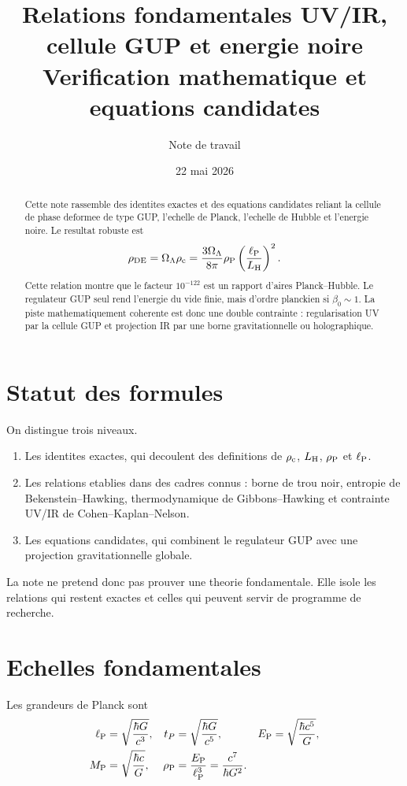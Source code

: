 \documentclass[11pt,a4paper]{article}
\title{Relations fondamentales UV/IR, cellule GUP et energie noire\\
\large Verification mathematique et equations candidates}
\author{Note de travail}
\date{22 mai 2026}
\newcommand{\lp}{\ell_{\rm P}}
\newcommand{\rhoP}{\rho_{\rm P}}
\newcommand{\rhoDE}{\rho_{\rm DE}}
\newcommand{\rhoC}{\rho_{\rm c}}
\newcommand{\LH}{L_{\rm H}}
\newcommand{\EP}{E_{\rm P}}
\newcommand{\Mpl}{M_{\rm P}}
\begin{document}
\maketitle

\begin{abstract}
Cette note rassemble des identites exactes et des equations candidates reliant
la cellule de phase deformee de type GUP, l'echelle de Planck, l'echelle de
Hubble et l'energie noire. Le resultat robuste est
\[
\rhoDE=\Omega_\Lambda\rhoC
=\frac{3\Omega_\Lambda}{8\pi}\rhoP\left(\frac{\lp}{\LH}\right)^2.
\]
Cette relation montre que le facteur $10^{-122}$ est un rapport d'aires
Planck--Hubble. Le regulateur GUP seul rend l'energie du vide finie, mais
d'ordre planckien si $\beta_0\sim1$. La piste mathematiquement coherente est
donc une double contrainte : regularisation UV par la cellule GUP et projection
IR par une borne gravitationnelle ou holographique.
\end{abstract}

\tableofcontents
\newpage

\section{Statut des formules}

On distingue trois niveaux.
\begin{enumerate}
  \item Les identites exactes, qui decoulent des definitions de $\rhoC$, $\LH$,
  $\rhoP$ et $\lp$.
  \item Les relations etablies dans des cadres connus : borne de trou noir,
  entropie de Bekenstein--Hawking, thermodynamique de Gibbons--Hawking et
  contrainte UV/IR de Cohen--Kaplan--Nelson.
  \item Les equations candidates, qui combinent le regulateur GUP avec une
  projection gravitationnelle globale.
\end{enumerate}

La note ne pretend donc pas prouver une theorie fondamentale. Elle isole les
relations qui restent exactes et celles qui peuvent servir de programme de
recherche.

\section{Echelles fondamentales}

Les grandeurs de Planck sont
\begin{align}
\lp &= \sqrt{\frac{\hbar G}{c^3}},&
t_P &= \sqrt{\frac{\hbar G}{c^5}},&
\EP &= \sqrt{\frac{\hbar c^5}{G}},\\
\Mpl &= \sqrt{\frac{\hbar c}{G}},&
\rhoP &= \frac{\EP}{\lp^3}=\frac{c^7}{\hbar G^2}.
\end{align}
\end{document}
